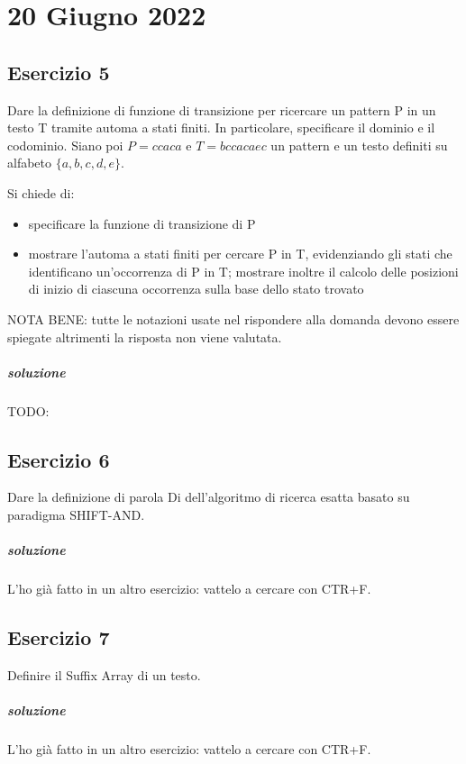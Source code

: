 \chapter{20 Giugno 2022}

\section{Esercizio 5}

Dare la definizione di funzione di transizione per ricercare un pattern P in un testo T tramite automa a stati finiti. In particolare, specificare il dominio e il codominio.
Siano poi $P=ccaca$ e $T=bccacaec$ un pattern e un testo definiti su alfabeto $\{a, b, c, d, e\}$.

Si chiede di:
\begin{itemize}
    \item specificare la funzione di transizione di P
    \item mostrare l'automa a stati finiti per cercare P in T, evidenziando gli stati che identificano un'occorrenza di P in T; mostrare inoltre il calcolo delle posizioni di inizio di ciascuna occorrenza sulla base dello stato trovato
\end{itemize}

NOTA BENE: tutte le notazioni usate nel rispondere alla domanda devono essere spiegate altrimenti la risposta non viene valutata.

\paragraph{soluzione} TODO:

\section{Esercizio 6}

Dare la definizione di parola Di dell'algoritmo di ricerca esatta basato su paradigma SHIFT-AND.

\paragraph{soluzione} L'ho gi\`a fatto in un altro esercizio: vattelo a cercare con CTR+F.

\section{Esercizio 7}

Definire il Suffix Array di un testo.

\paragraph{soluzione} L'ho gi\`a fatto in un altro esercizio: vattelo a cercare con CTR+F.
